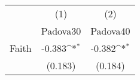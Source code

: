 {
\def\sym#1{\ifmmode^{#1}\else\(^{#1}\)\fi}
\begin{tabular}{l*{2}{c}}
\toprule
            &\multicolumn{1}{c}{(1)}&\multicolumn{1}{c}{(2)}\\
            &\multicolumn{1}{c}{Padova30}&\multicolumn{1}{c}{Padova40}\\
\midrule
Faith       &      -0.383\sym{*}  &      -0.382\sym{*}  \\
            &     (0.183)         &     (0.184)         \\
\bottomrule
\end{tabular}
}
